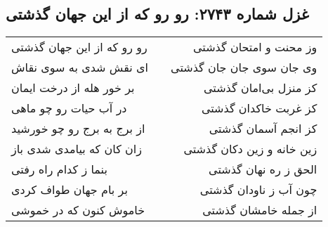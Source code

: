\begin{center}
\section*{غزل شماره ۲۷۴۳: رو رو که از این جهان گذشتی}
\label{sec:2743}
\begin{longtable}{l p{0.5cm} r}
رو رو که از این جهان گذشتی
&&
وز محنت و امتحان گذشتی
\\
ای نقش شدی به سوی نقاش
&&
وی جان سوی جان جان گذشتی
\\
بر خور هله از درخت ایمان
&&
کز منزل بی‌امان گذشتی
\\
در آب حیات رو چو ماهی
&&
کز غربت خاکدان گذشتی
\\
از برج به برج رو چو خورشید
&&
کز انجم آسمان گذشتی
\\
زان کان که بیامدی شدی باز
&&
زین خانه و زین دکان گذشتی
\\
بنما ز کدام راه رفتی
&&
الحق ز ره نهان گذشتی
\\
بر بام جهان طواف کردی
&&
چون آب ز ناودان گذشتی
\\
خاموش کنون که در خموشی
&&
از جمله خامشان گذشتی
\\
\end{longtable}
\end{center}
